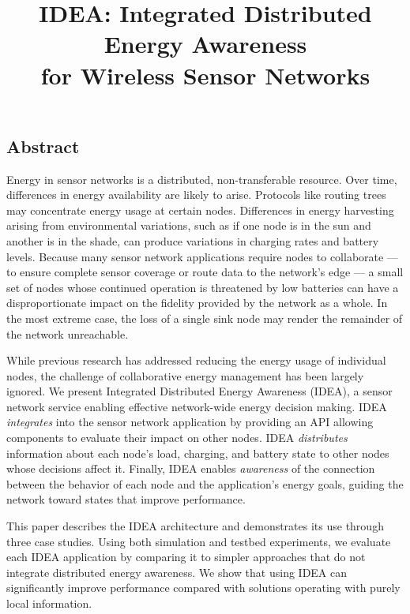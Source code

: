 \documentclass[twocolumn,10pt]{usetex-v1}
\begin{document}
\title{IDEA: Integrated Distributed Energy Awareness\\for Wireless Sensor Networks}

\author{
}

\maketitle
\thispagestyle{empty}

\subsection*{Abstract}
Energy in sensor networks is a distributed, non-transferable resource. Over
time, differences in energy availability are likely to arise. Protocols like
routing trees may concentrate energy usage at certain nodes. Differences in
energy harvesting arising from environmental variations, such as if one node
is in the sun and another is in the shade, can produce variations in charging
rates and battery levels. Because many sensor network applications require
nodes to collaborate --- to ensure complete sensor coverage or route data to
the network's edge --- a small set of nodes whose continued operation is
threatened by low batteries can have a disproportionate impact on the
fidelity provided by the network as a whole. In the most extreme case, the loss
of a single sink node may render the remainder of the network unreachable.

While previous research has addressed reducing the energy usage of individual
nodes, the challenge of collaborative energy management has been largely
ignored. We present Integrated Distributed Energy Awareness (IDEA), a sensor
network service enabling effective network-wide energy decision making. IDEA
\textit{integrates} into the sensor network application by providing an API
allowing components to evaluate their impact on other nodes.  IDEA
\textit{distributes} information about each node's load, charging, and
battery state to other nodes whose decisions affect it. Finally, IDEA enables
\textit{awareness} of the connection between the behavior of each node and
the application's energy goals, guiding the network toward states that
improve performance.

This paper describes the IDEA architecture and demonstrates its use through
three case studies. Using both simulation and testbed experiments, we
evaluate each IDEA application by comparing it to simpler approaches that do
not integrate distributed energy awareness. We show that using IDEA can
significantly improve performance compared with solutions operating with
purely local information.









\begin{footnotesize}
 
\end{footnotesize}
\end{document}
